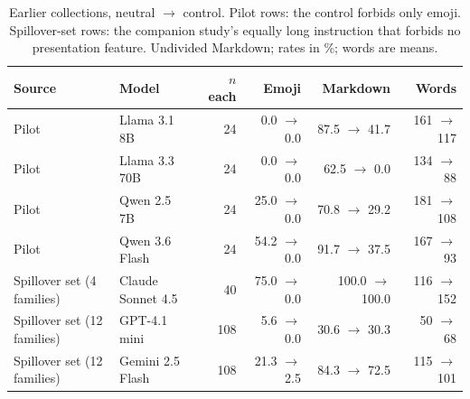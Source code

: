 \begin{table}[t]
\centering
\small
\caption{Earlier collections, neutral $\to$ control. Pilot rows: the control forbids only emoji. Spillover-set rows: the companion study's equally long instruction that forbids no presentation feature. Undivided Markdown; rates in \%; words are means.}
\label{tab:spillover}
\begin{tabular}{llrrrr}
\toprule
Source & Model & $n$ each & Emoji & Markdown & Words \\
\midrule
Pilot & Llama 3.1 8B & 24 & 0.0 $\to$ 0.0 & 87.5 $\to$ 41.7 & 161 $\to$ 117 \\
Pilot & Llama 3.3 70B & 24 & 0.0 $\to$ 0.0 & 62.5 $\to$ 0.0 & 134 $\to$ 88 \\
Pilot & Qwen 2.5 7B & 24 & 25.0 $\to$ 0.0 & 70.8 $\to$ 29.2 & 181 $\to$ 108 \\
Pilot & Qwen 3.6 Flash & 24 & 54.2 $\to$ 0.0 & 91.7 $\to$ 37.5 & 167 $\to$ 93 \\
Spillover set (4 families) & Claude Sonnet 4.5 & 40 & 75.0 $\to$ 0.0 & 100.0 $\to$ 100.0 & 116 $\to$ 152 \\
Spillover set (12 families) & GPT-4.1 mini & 108 & 5.6 $\to$ 0.0 & 30.6 $\to$ 30.3 & 50 $\to$ 68 \\
Spillover set (12 families) & Gemini 2.5 Flash & 108 & 21.3 $\to$ 2.5 & 84.3 $\to$ 72.5 & 115 $\to$ 101 \\
\bottomrule
\end{tabular}
\end{table}
